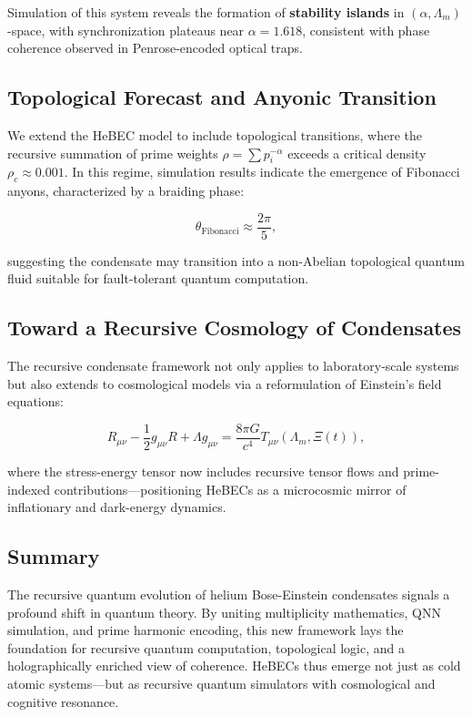 \documentclass{article}
\theoremstyle{plain}
\begin{document}
Simulation of this system reveals the formation of \textbf{stability islands} in \((\alpha, \Lambda_m)\)-space, with synchronization plateaus near \(\alpha = 1.618\), consistent with phase coherence observed in Penrose-encoded optical traps.

\subsection{Topological Forecast and Anyonic Transition}
We extend the HeBEC model to include topological transitions, where the recursive summation of prime weights \(\rho = \sum p_i^{-\alpha}\) exceeds a critical density \(\rho_c \approx 0.001\). In this regime, simulation results indicate the emergence of Fibonacci anyons, characterized by a braiding phase:

\begin{equation}
\theta_{\text{Fibonacci}} \approx \frac{2\pi}{5},
\end{equation}

suggesting the condensate may transition into a non-Abelian topological quantum fluid suitable for fault-tolerant quantum computation.

\subsection{Toward a Recursive Cosmology of Condensates}
The recursive condensate framework not only applies to laboratory-scale systems but also extends to cosmological models via a reformulation of Einstein's field equations:

\begin{equation}
R_{\mu \nu} - \frac{1}{2}g_{\mu \nu}R + \Lambda g_{\mu \nu} = \frac{8 \pi G}{c^4} T_{\mu \nu}(\Lambda_m, \Xi(t)),
\end{equation}

where the stress-energy tensor now includes recursive tensor flows and prime-indexed contributions—positioning HeBECs as a microcosmic mirror of inflationary and dark-energy dynamics.

\subsection*{Summary}
The recursive quantum evolution of helium Bose-Einstein condensates signals a profound shift in quantum theory. By uniting multiplicity mathematics, QNN simulation, and prime harmonic encoding, this new framework lays the foundation for recursive quantum computation, topological logic, and a holographically enriched view of coherence. HeBECs thus emerge not just as cold atomic systems—but as recursive quantum simulators with cosmological and cognitive resonance.
\end{document}
